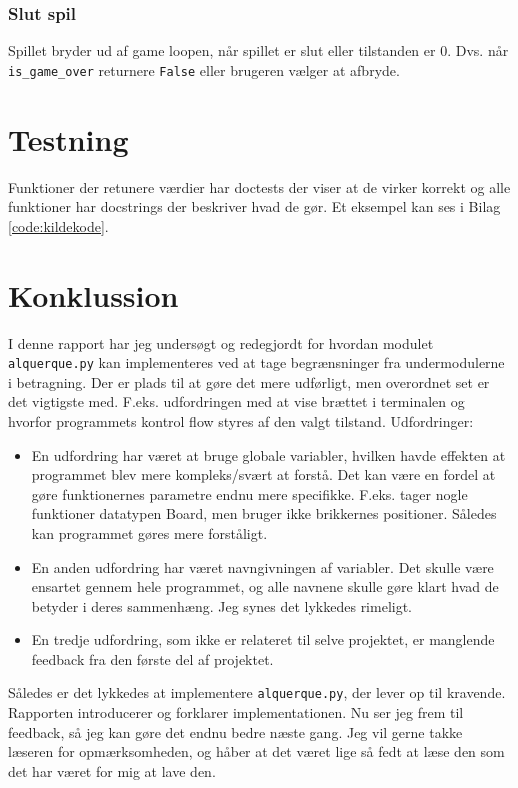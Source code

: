 \documentclass{article}
\begin{document}
\subsubsection{Slut spil}
Spillet bryder ud af game loopen, når spillet er slut eller tilstanden er 0. Dvs. når \texttt{is\_game\_over} returnere \texttt{False}
eller brugeren vælger at afbryde.

%
\section{Testning}
Funktioner der retunere værdier har doctests der viser at de virker korrekt og alle
funktioner har docstrings der beskriver hvad de gør. Et eksempel kan ses i Bilag \ref{code:kildekode}.
%
\newpage
\section{Konklussion}
I denne rapport har jeg undersøgt og redegjordt for hvordan modulet \texttt{alquerque.py} kan implementeres
ved at tage begrænsninger fra undermodulerne i betragning. Der er plads til at gøre det mere udførligt,
men overordnet set er det vigtigste med. F.eks. udfordringen med at vise brættet i terminalen og
hvorfor programmets kontrol flow styres af den valgt tilstand.
\bigbreak
Udfordringer:
\begin{itemize}
    \item En udfordring har været at bruge globale variabler, hvilken havde effekten at programmet blev mere kompleks/svært at forstå. Det kan være en fordel at gøre funktionernes parametre endnu mere specifikke. F.eks. tager nogle funktioner datatypen Board, men bruger ikke brikkernes positioner. Således kan programmet gøres mere forståligt.
    \item En anden udfordring har været navngivningen af variabler. Det skulle være ensartet gennem hele programmet, og alle navnene skulle gøre klart hvad de betyder i deres sammenhæng. Jeg synes det lykkedes rimeligt.
    \item En tredje udfordring, som ikke er relateret til selve projektet, er manglende feedback fra den første del af projektet.
\end{itemize}
Således er det lykkedes at implementere \texttt{alquerque.py}, der lever op til kravende. Rapporten introducerer og forklarer
implementationen.
Nu ser jeg frem til feedback,
så jeg kan gøre det endnu bedre næste gang. Jeg vil gerne takke læseren for opmærksomheden, og håber at det været lige så fedt at læse den
som det har været for mig at lave den.
\end{document}
